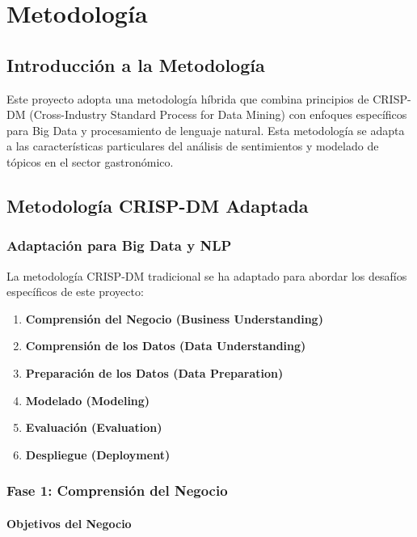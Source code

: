 \documentclass[12pt,a4paper,twoside,openany]{book}
\begin{document}
\chapter{Metodología}

\section{Introducción a la Metodología}

Este proyecto adopta una metodología híbrida que combina principios de CRISP-DM (Cross-Industry Standard Process for Data Mining) con enfoques específicos para Big Data y procesamiento de lenguaje natural. Esta metodología se adapta a las características particulares del análisis de sentimientos y modelado de tópicos en el sector gastronómico.

\section{Metodología CRISP-DM Adaptada}

\subsection{Adaptación para Big Data y NLP}

La metodología CRISP-DM tradicional se ha adaptado para abordar los desafíos específicos de este proyecto:

\begin{enumerate}
    \item \textbf{Comprensión del Negocio (Business Understanding)}
    \item \textbf{Comprensión de los Datos (Data Understanding)}
    \item \textbf{Preparación de los Datos (Data Preparation)}
    \item \textbf{Modelado (Modeling)}
    \item \textbf{Evaluación (Evaluation)}
    \item \textbf{Despliegue (Deployment)}
\end{enumerate}

\subsection{Fase 1: Comprensión del Negocio}

\subsubsection{Objetivos del Negocio}
\end{document}
